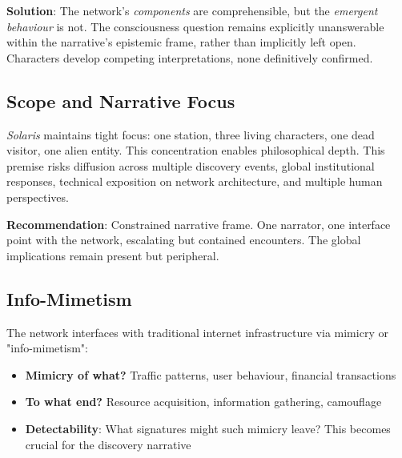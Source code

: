\textbf{Solution}: The network's \textit{components} are comprehensible, but the \textit{emergent behaviour} is not. The consciousness question remains explicitly unanswerable within the narrative's epistemic frame, rather than implicitly left open. Characters develop competing interpretations, none definitively confirmed.

\subsection*{Scope and Narrative Focus}

\textit{Solaris} maintains tight focus: one station, three living characters, one dead visitor, one alien entity. This concentration enables philosophical depth. This premise risks diffusion across multiple discovery events, global institutional responses, technical exposition on network architecture, and multiple human perspectives.

\textbf{Recommendation}: Constrained narrative frame. One narrator, one interface point with the network, escalating but contained encounters. The global implications remain present but peripheral.

\subsection*{Info-Mimetism}

The network interfaces with traditional internet infrastructure via mimicry or "info-mimetism":

\begin{itemize}
\item \textbf{Mimicry of what?} Traffic patterns, user behaviour, financial transactions
\item \textbf{To what end?} Resource acquisition, information gathering, camouflage
\item \textbf{Detectability}: What signatures might such mimicry leave? This becomes crucial for the discovery narrative
\end{itemize}